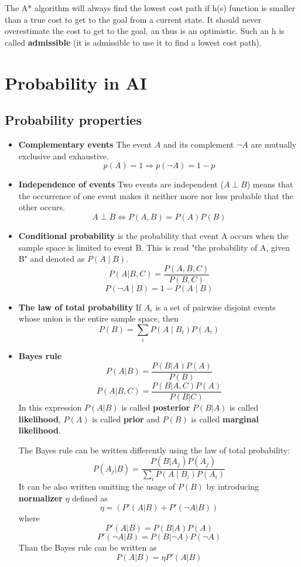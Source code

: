 \documentclass[a4paper,10pt]{article}
\begin{document}
The A* algorithm will always find the lowest cost path if h(s) function is smaller than a true cost to get to the goal from a current state. It should never overestimate the cost to get to the goal, an thus is an  optimistic. Such an h is called \textbf{admissible} (it is admissible to use it to find a lowest cost path). 

\section{Probability in AI}

\subsection{Probability properties}
\begin{itemize}
\item \textbf{Complementary events} The event $A$ and its complement $\neg A$ are mutually exclusive and exhaustive.
\[p(A) = 1 \Rightarrow p(\neg A) = 1-p \]
\item \textbf{Independence of events} Two events are independent ($A\perp B$) means that the occurrence of one event makes it neither more nor less probable that the other occurs.
\[ A\perp B \Leftrightarrow P(A,B) = P(A)P(B) \]
\item \textbf{Conditional probability} is the probability that event A occurs when the sample space is limited to event B. This is read "the probability of A, given B" and denoted as $P(A\mid B)$.
\[P(A|B,C) = \frac{P(A,B,C)}{P(B,C)} \]
\[P(\neg A\mid B) = 1-P(A \mid B) \]
\item \textbf{The law of total probability}
If $A_i$ is a set of pairwise disjoint events whose union is the entire sample space, then
\[P(B) = \sum_{i} P(A \mid B_i)P(A_i) \]
\item \textbf{Bayes rule}
\[ P(A|B) = \frac{P(B|A)P(A)}{P(B)} \]
\[ P(A|B,C) = \frac{P(B|A,C)P(A)}{P(B|C)} \]
In this expression $P(A|B)$ is called \textbf{posterior} $P(B|A)$ is called \textbf{likelihood}, $P(A)$ is called \textbf{prior} and $P(B)$ is called \textbf{marginal likelihood}. 

The Bayes rule can be written differently using the law of total probability:
\[ P(A_j|B) = \frac{P(B|A_j)P(A_j)}{\sum_{i} P(A \mid B_i)P(A_i)} \]
It can be also written omitting the usage of $P(B)$ by introducing \textbf{normalizer} $\eta$ defined as
\[ \eta =(P'(A|B)+P'(\neg A|B)) \]
where
\[ P'(A|B) = P(B|A)P(A) \]
\[ P'(\neg A|B) = P(B|\neg A)P(\neg A)\]
Than the Bayes rule can be written as
\[ P(A|B) = \eta P'(A|B) \]


\end{itemize}
\end{document}
